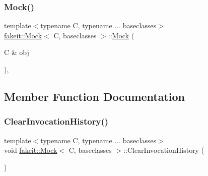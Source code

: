 \mbox{\label{classfakeit_1_1Mock_aa474a0d6c7447608253a0fc306eb6ef5}} 
\subsubsection{\texorpdfstring{Mock()}{Mock()}\hspace{0.1cm}{\footnotesize\ttfamily [18/18]}}
{\footnotesize\ttfamily template$<$typename C, typename ... baseclasses$>$ \\
\mbox{\hyperlink{classfakeit_1_1Mock}{fakeit\+::\+Mock}}$<$ C, baseclasses $>$\+::\mbox{\hyperlink{classfakeit_1_1Mock}{Mock}} (\begin{DoxyParamCaption}\item[{C \&}]{obj }\end{DoxyParamCaption})\hspace{0.3cm}{\ttfamily [inline]}, {\ttfamily [explicit]}}



\subsection{Member Function Documentation}
\mbox{\label{classfakeit_1_1Mock_ac9e21ef9c73c735287c7fd3dd110aafc}} 
\subsubsection{\texorpdfstring{ClearInvocationHistory()}{ClearInvocationHistory()}\hspace{0.1cm}{\footnotesize\ttfamily [1/9]}}
{\footnotesize\ttfamily template$<$typename C, typename ... baseclasses$>$ \\
void \mbox{\hyperlink{classfakeit_1_1Mock}{fakeit\+::\+Mock}}$<$ C, baseclasses $>$\+::Clear\+Invocation\+History (\begin{DoxyParamCaption}{ }\end{DoxyParamCaption})\hspace{0.3cm}{\ttfamily [inline]}}

